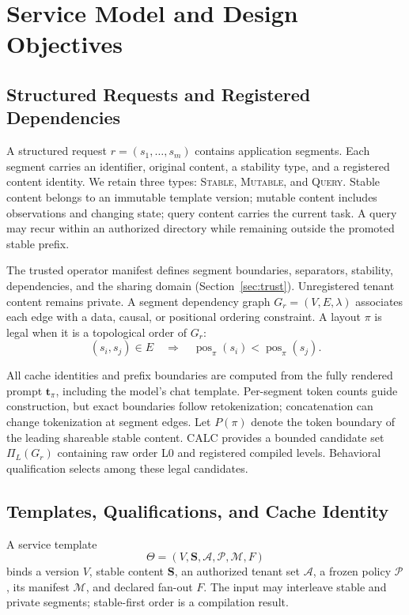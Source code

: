 \section{Service Model and Design Objectives}
\label{sec:model}

\subsection{Structured Requests and Registered Dependencies}
A structured request $r=(s_1,\ldots,s_m)$ contains application segments. Each segment carries an identifier, original content, a stability type, and a registered content identity. We retain three types: \textsc{Stable}, \textsc{Mutable}, and \textsc{Query}. Stable content belongs to an immutable template version; mutable content includes observations and changing state; query content carries the current task. A query may recur within an authorized directory while remaining outside the promoted stable prefix.

The trusted operator manifest defines segment boundaries, separators, stability, dependencies, and the sharing domain (Section~\ref{sec:trust}). Unregistered tenant content remains private. A segment dependency graph $G_r=(V,E,\lambda)$ associates each edge with a data, causal, or positional ordering constraint. A layout $\pi$ is legal when it is a topological order of $G_r$:
\begin{equation}
 (s_i,s_j)\in E\quad\Longrightarrow\quad
 \operatorname{pos}_{\pi}(s_i)<\operatorname{pos}_{\pi}(s_j).
\end{equation}

All cache identities and prefix boundaries are computed from the fully rendered prompt $\mathbf{t}_{\pi}$, including the model's chat template. Per-segment token counts guide construction, but exact boundaries follow retokenization; concatenation can change tokenization at segment edges. Let $P(\pi)$ denote the token boundary of the leading shareable stable content. CALC provides a bounded candidate set $\Pi_L(G_r)$ containing raw order L0 and registered compiled levels. Behavioral qualification selects among these legal candidates.

\subsection{Templates, Qualifications, and Cache Identity}
A service template
\begin{equation}
 \Theta=(V,\mathbf S,\mathcal A,\mathcal P,\mathcal M,F)
\end{equation}
binds a version $V$, stable content $\mathbf S$, an authorized tenant set $\mathcal A$, a frozen policy $\mathcal P$, its manifest $\mathcal M$, and declared fan-out $F$. The input may interleave stable and private segments; stable-first order is a compilation result.


